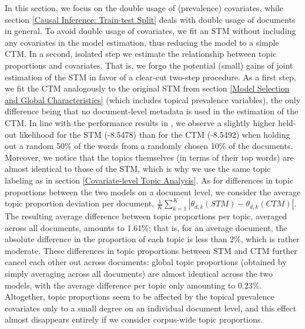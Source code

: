 In this section, we focus on the double usage of (prevalence) covariates, while section \ref{Causal Inference: Train-test Split} deals with double usage of documents in general. To avoid double usage of covariates, we fit an STM without including any covariates in the model estimation, thus reducing the model to a simple CTM. In a second, isolated step we estimate the relationship between topic proportions and covariates. That is, we forgo the potential (small) gains of joint estimation of the STM in favor of a clear-cut two-step procedure. As a first step, we fit the CTM analogously to the original STM from section \ref{Model Selection and Global Characteristics} (which includes topical prevalence variables), the only difference being that no document-level metadata is used in the estimation of the CTM. In line with the performance results in \cite{roberts2016model}, we observe a slightly higher held-out likelihood for the STM (-8.5478) than for the CTM (-8.5492) when holding out a random 50\% of the words from a randomly chosen 10\% of the documents. Moreover, we notice that the topics themselves (in terms of their top words) are almost identical to those of the STM, which is why we use the same topic labeling as in section \ref{Covariate-level Topic Analysis}. As for differences in topic proportions between the two models on a document level, we consider the average topic proportion deviation per document, $\frac{1}{K}\sum_{k=1}^{K}|\theta_{d,k}(STM)-\theta_{d,k}(CTM)|$. The resulting average difference between topic proportions per topic, averaged across all documents, amounts to 1.61\%; that is, for an average document, the absolute difference in the proportion of each topic is less than 2\%, which is rather moderate. These differences in topic proportions between STM and CTM further cancel each other out across documents: global topic proportions (obtained by simply averaging across all documents) are almost identical across the two models, with the average difference per topic only
amounting to 0.23\%. Altogether, topic proportions seem to be affected by the topical prevalence covariates only to a small degree on an individual document level, and this effect almost disappears entirely if we consider corpus-wide topic proportions.

